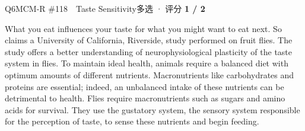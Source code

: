 \begin{qblock}{Q6\quad MCM-R \#118\ \ Taste Sensitivity}{多选 · 评分 \textcolor{cAccent}{\bfseries 1 / 2}}
\begin{promptbox}
What you eat influences your taste for what you might want to eat next. So claims a University of California, Riverside, study performed on fruit flies. The study offers a better understanding of neurophysiological plasticity of the taste system in flies. To maintain ideal health, animals require a balanced diet with optimum amounts of different nutrients. Macronutrients like carbohydrates and proteins are essential; indeed, an unbalanced intake of these nutrients can be detrimental to health. Flies require macronutrients such as sugars and amino acids for survival. They use the gustatory system, the sensory system responsible for the perception of taste, to sense these nutrients and begin feeding.


\end{promptbox}
\end{qblock}
